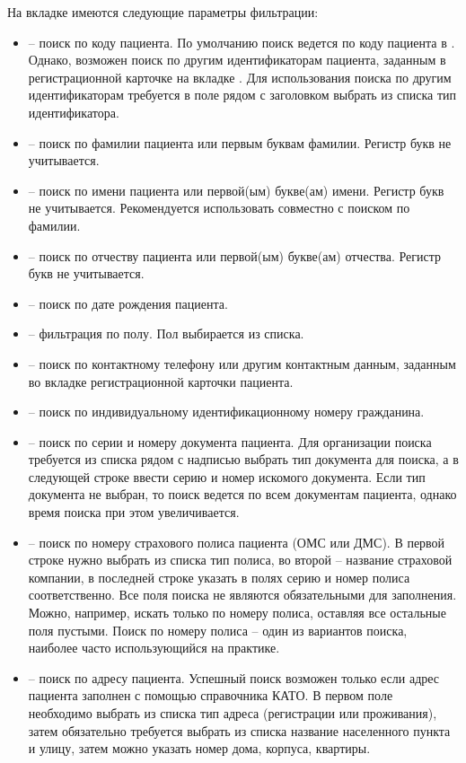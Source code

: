 На вкладке  имеются следующие параметры фильтрации:
\begin{itemize}
 \item {} – поиск по коду пациента. По умолчанию поиск ведется по коду пациента в \tmis. Однако, возможен поиск по другим идентификаторам пациента, заданным в регистрационной карточке на вкладке . Для использования поиска по другим идентификаторам требуется в поле рядом с заголовком  выбрать из списка тип идентификатора.
 \item {} – поиск по фамилии пациента или первым буквам фамилии. Регистр букв не учитывается.
 \item	{} – поиск по имени пациента или первой(ым) букве(ам) имени. Регистр букв не учитывается. Рекомендуется использовать совместно с поиском по фамилии.
 \item	{} – поиск по отчеству пациента или первой(ым) букве(ам) отчества. Регистр букв не учитывается.
 \item	{} – поиск по дате рождения пациента.
 \item	{} – фильтрация по полу. Пол выбирается из списка.
 \item {} – поиск по контактному телефону или другим контактным данным, заданным во вкладке  регистрационной карточки пациента.
 \item	{} – поиск по индивидуальному идентификационному номеру гражданина.
 \item	{} – поиск по серии и номеру документа пациента. Для организации поиска требуется из списка рядом с надписью  выбрать тип документа для поиска, а в следующей строке ввести серию и номер искомого документа. Если тип документа не выбран, то поиск ведется по всем документам пациента, однако время поиска при этом увеличивается.
 \item	{} – поиск по номеру страхового полиса пациента (ОМС или ДМС). В первой строке нужно выбрать из списка тип полиса, во второй – название страховой компании, в последней строке указать в полях серию и номер полиса соответственно. Все поля поиска не являются обязательными для заполнения. Можно, например, искать только по номеру полиса, оставляя все остальные поля пустыми. Поиск по номеру полиса – один из вариантов поиска, наиболее часто использующийся на практике.
 \item	{} – поиск по адресу пациента. Успешный поиск возможен только если адрес пациента заполнен с помощью справочника КАТО. В первом поле необходимо выбрать из списка тип адреса (регистрации или проживания), затем обязательно требуется выбрать из списка название населенного пункта и улицу, затем можно указать номер дома, корпуса, квартиры.

\end{itemize}
